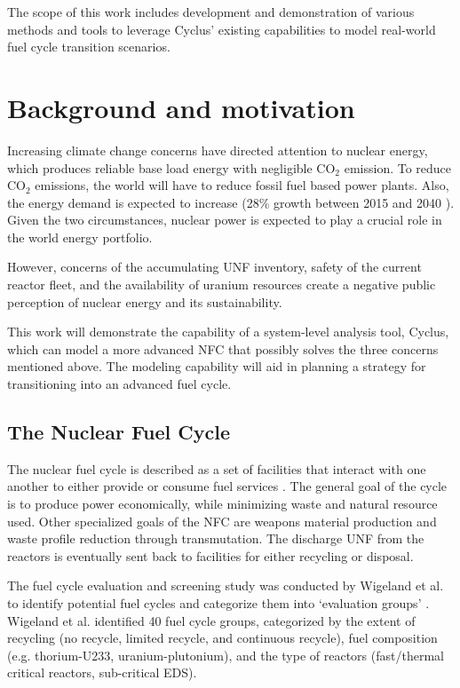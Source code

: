 The scope of this work includes development and demonstration of
various methods and tools to leverage Cyclus' existing
capabilities to model real-world fuel cycle transition scenarios.

\section{Background and motivation}
Increasing climate change concerns have directed attention
to nuclear energy, which produces reliable base load energy
with negligible CO$_2$ emission. To reduce CO$_2$ emissions,
the world will have to reduce fossil fuel based power plants.
Also, the energy demand is expected to increase
(28\% growth between 2015 and 2040 \cite{conti_international_2016}).
Given the two circumstances,
nuclear power is expected to play a crucial role in the world energy portfolio.

However, concerns of the accumulating \gls{UNF} inventory,
safety of the current reactor fleet, and the availability of
uranium resources create a negative public perception of
nuclear energy and its sustainability.

This work will demonstrate the capability of a system-level
analysis tool, Cyclus, which can model a more advanced \gls{NFC} that
possibly solves the three concerns mentioned above. 
The modeling capability will aid in planning a strategy for
transitioning into an advanced fuel cycle.

\subsection{The Nuclear Fuel Cycle}
The nuclear fuel cycle is described as a set of facilities
that interact with one another to either provide or consume
fuel services \cite{gidden_agent-based_2015}. The general goal of
the cycle is to produce power economically, while minimizing
waste and natural resource used. Other specialized goals of the \gls{NFC} are
weapons material production and waste profile reduction through transmutation.
The discharge \gls{UNF} from the reactors is eventually sent back to facilities for
either recycling or disposal.

The fuel cycle evaluation and screening study was
conducted by Wigeland et al. to identify potential
fuel cycles and categorize them into `evaluation groups' \cite{wigeland_nuclear_2014}.
Wigeland et al. identified 40 fuel cycle groups, categorized by the extent of recycling
(no recycle, limited recycle, and continuous recycle), fuel composition
(e.g. thorium-U233, uranium-plutonium), and the type of reactors (fast/thermal critical
reactors, sub-critical \gls{EDS}).



